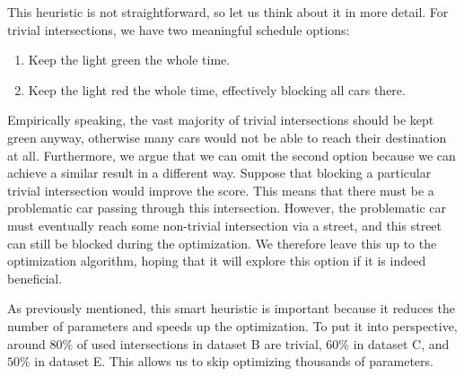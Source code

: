 This heuristic is not straightforward, so let us think about it in more detail. For trivial intersections, we have two meaningful schedule options:
\begin{enumerate}
    \item Keep the light green the whole time.
    \item Keep the light red the whole time, effectively blocking all cars there.
\end{enumerate}
Empirically speaking, the vast majority of trivial intersections should be kept green anyway, otherwise many cars would not be able to reach their destination at all.
Furthermore, we argue that we can omit the second option because we can achieve a similar result in a different way. Suppose that blocking a particular trivial intersection would improve the score. This means that there must be a problematic car passing through this intersection. However, the problematic car must eventually reach some non-trivial intersection via a street, and this street can still be blocked during the optimization. We therefore leave this up to the optimization algorithm, hoping that it will explore this option if it is indeed beneficial.


As previously mentioned, this smart heuristic is important because it reduces the number of parameters and speeds up the optimization. To put it into perspective, around $80 \%$ of used intersections in dataset B are trivial, $60 \%$ in dataset C, and $50 \%$ in dataset E. This allows us to skip optimizing thousands of parameters.
